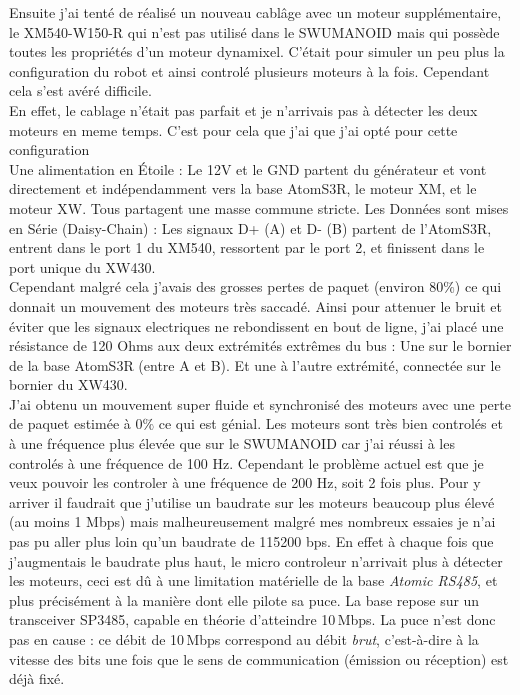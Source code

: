 \documentclass{tropLaClasse}
\begin{document}
Ensuite j'ai tenté de réalisé un nouveau cablâge avec un moteur supplémentaire, le XM540-W150-R qui n'est pas utilisé dans le SWUMANOID mais qui possède toutes les propriétés d'un moteur dynamixel. C'était pour simuler un peu plus la configuration du robot et ainsi controlé plusieurs moteurs à la fois. Cependant cela s'est avéré difficile.\\

En effet, le cablage n'était pas parfait et je n'arrivais pas à détecter les deux moteurs en meme temps. C'est pour cela que j'ai que j'ai opté pour cette configuration \\

Une alimentation en Étoile : Le 12V et le GND partent du générateur et vont directement et indépendamment vers la base AtomS3R, le moteur XM, et le moteur XW. Tous partagent une masse commune stricte. Les Données sont mises en Série (Daisy-Chain) : Les signaux D+ (A) et D- (B) partent de l'AtomS3R, entrent dans le port 1 du XM540, ressortent par le port 2, et finissent dans le port unique du XW430.\\

Cependant malgré cela j'avais des grosses pertes de paquet (environ $80\%$) ce qui donnait un mouvement des moteurs très saccadé. Ainsi pour attenuer le bruit et éviter que les signaux electriques ne rebondissent en bout de ligne, j'ai placé une résistance de 120 Ohms aux deux extrémités extrêmes du bus : Une sur le bornier de la base AtomS3R (entre A et B). Et une à l'autre extrémité, connectée sur le bornier du XW430.\\

J'ai obtenu un mouvement super fluide et synchronisé des moteurs avec une perte de paquet estimée à $0\%$ ce qui est génial. Les moteurs sont très bien controlés et à une fréquence plus élevée que sur le SWUMANOID car j'ai réussi à les controlés à une fréquence de 100 Hz. Cependant le problème actuel est que je veux pouvoir les controler à une fréquence de 200 Hz, soit 2 fois plus. Pour y arriver il faudrait que j'utilise un baudrate sur les moteurs beaucoup plus élevé (au moins 1 Mbps) mais malheureusement malgré mes nombreux essaies je n'ai pas pu aller plus loin qu'un baudrate de 115200 bps. En effet à chaque fois que j'augmentais le baudrate plus haut, le micro controleur n'arrivait plus à détecter les moteurs, ceci est dû à une limitation matérielle de la base \textit{Atomic RS485}, et plus précisément à la manière dont elle pilote sa puce. La base repose sur un transceiver SP3485, capable en théorie d'atteindre 10\,Mbps. La puce n'est donc pas en cause : ce débit de 10\,Mbps correspond au débit \emph{brut}, c'est-à-dire à la vitesse des bits une fois que le sens de communication (émission ou réception) est déjà fixé.\\
\end{document}
